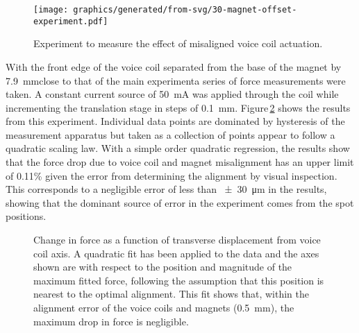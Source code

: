 \begin{figure}
  \centering
  \texttt{[image: graphics/generated/from-svg/30-magnet-offset-experiment.pdf]}
  \caption[Experiment to measure the effect of misaligned voice coil actuation]{\label{fig:misaligned-voice-coil-experiment}Experiment to measure the effect of misaligned voice coil actuation.}
\end{figure}

With the front edge of the voice coil separated from the base of the magnet by \SI{7.9}{\milli\meter}\textemdash close to that of the main experiment\textemdash a series of force measurements were taken. A constant current source of \SI{50}{\milli\ampere} was applied through the coil while incrementing the translation stage in steps of \SI{0.1}{\milli\meter}. Figure\,\ref{fig:misaligned-voice-coil-results} shows the results from this experiment. Individual data points are dominated by hysteresis of the measurement apparatus but taken as a collection of points appear to follow a quadratic scaling law. With a simple  order quadratic regression, the results show that the force drop due to voice coil and magnet misalignment has an upper limit of \SI{0.11}{}\% given the error from determining the alignment by visual inspection. This corresponds to a negligible error of less than \SI{\pm30}{\micro\meter} in the results, showing that the dominant source of error in the experiment comes from the spot positions.

\begin{figure}
  \centering
  
  \caption[Change in force as a function of transverse displacement from voice coil axis]{\label{fig:misaligned-voice-coil-results}Change in force as a function of transverse displacement from voice coil axis. A quadratic fit has been applied to the data and the axes shown are with respect to the position and magnitude of the maximum fitted force, following the assumption that this position is nearest to the optimal alignment. This fit shows that, within the alignment error of the voice coils and magnets (\SI{0.5}{\milli\meter}), the maximum drop in force is negligible.}
\end{figure}

